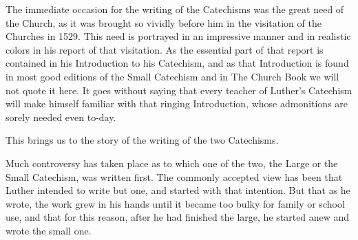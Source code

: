 The immediate occasion for the writing of the Catechisms was the great need of the Church, as it was brought so vividly before him in the visitation of the Churches in 1529. This need is portrayed in an impressive manner and in realistic colors in his 
report of that visitation. As the essential part of that report is contained in his Introduction to his Catechism, and as that Introduction is found in most good editions of the Small Catechism and in The Church Book we will not quote it here. It goes without saying that every teacher of Luther’s Catechism will make himself familiar with that ringing Introduction, whose admonitions are sorely needed even to-day.

This brings us to the story of the writing of the two Catechisms.

 Much controversy has taken place as to which one of the two, the Large or the Small Catechism, was written first. The commonly accepted view has been that Luther intended to write but one, and started with that intention. But that as he wrote, the work grew in his hands until it became too bulky for family or school use, and that for this reason, after he had finished the large, he started anew and wrote the small one.

